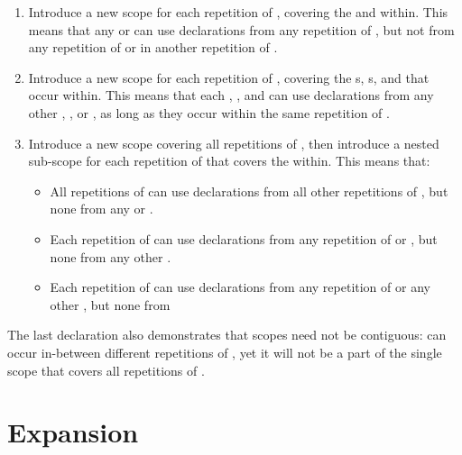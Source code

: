 \documentclass{kththesis}
\begin{document}
\begin{enumerate}
  \item {}

  Introduce a new scope for each repetition of , covering the  and  within. This means that any  or  can use declarations from any repetition of , but not from any repetition of  or  in another repetition of .

  \item {}

  Introduce a new scope for each repetition of , covering the s, s, and  that occur within. This means that each , , and  can use declarations from any other , , or , as long as they occur within the same repetition of .

  \item {}

  Introduce a new scope covering all repetitions of , then introduce a nested sub-scope for each repetition of  that covers the  within. This means that:
  \begin{itemize}
    \item All repetitions of  can use declarations from all other repetitions of , but none from any  or .
    \item Each repetition of  can use declarations from any repetition of  or , but none from any other .
    \item Each repetition of  can use declarations from any repetition of  or any other , but none from 
  \end{itemize}
\end{enumerate}

The last declaration also demonstrates that scopes need not be contiguous:  can occur in-between different repetitions of , yet it will not be a part of the single scope that covers all repetitions of .

\section{Expansion} \label{sec:design-implementation}
\end{document}
